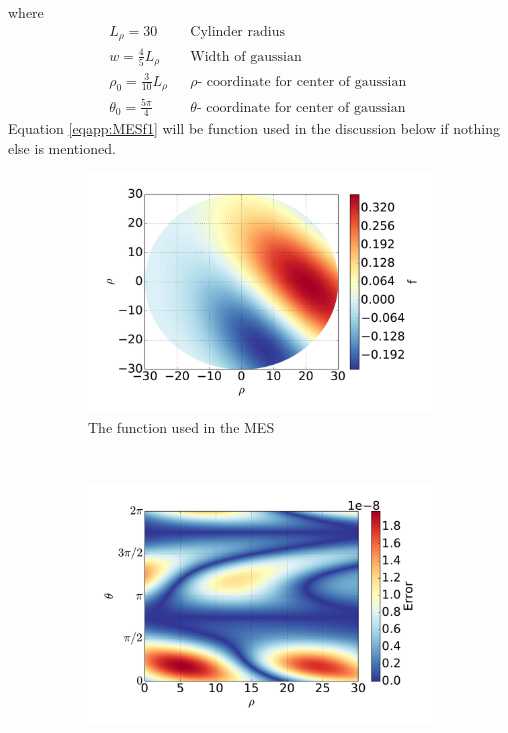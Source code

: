%
where
%
\begin{align*}
    &L_\rho = 30&
    &\text{
        Cylinder radius
    }&
    \\
    &w = \frac{4}{5}L_\rho&
    &\text{
        Width of gaussian
    }&
    \\
    &\rho_0 = \frac{3}{10}L_\rho&
    &
    \rho
    \text{
        - coordinate for center of gaussian
    }&
    \\
    &\theta_0 = \frac{5\pi}{4}&
    &
    \theta
    \text{
        - coordinate for center of gaussian
    }&
\end{align*}
%
Equation \ref{eqapp:MESf1} will be function used in the discussion below if nothing else is mentioned.
%
\begin{figure}[t!]
    \centering
    \begin{subfigure}[t]{0.45\textwidth}
        \centering
        \includegraphics[width=1.0\textwidth]{fig/f}
        \caption{The function used in the MES}
    \end{subfigure}%
    ~
    \begin{subfigure}[t]{0.45\textwidth}
        \centering
        \includegraphics[width=1.0\textwidth]{fig/err}

\end{subfigure}
\end{figure}
